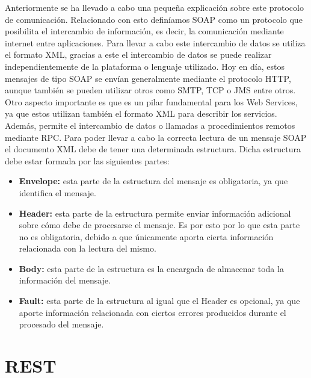 Anteriormente se ha llevado a cabo una pequeña explicación sobre este protocolo de comunicación. Relacionado con esto definíamos SOAP como un protocolo que posibilita el intercambio de información, es decir, la comunicación mediante internet entre aplicaciones. Para llevar a cabo este intercambio de datos se utiliza el formato XML, gracias a este el intercambio de datos se puede realizar independientemente de la plataforma o lenguaje utilizado.
Hoy en día, estos mensajes de tipo SOAP se envían generalmente mediante el protocolo HTTP, aunque también se pueden utilizar otros como SMTP, TCP o JMS entre otros. Otro aspecto importante es que es un pilar fundamental para los Web Services, ya que estos utilizan también el formato XML para describir los servicios. Además, permite el intercambio de datos o llamadas a procedimientos remotos mediante RPC.
Para poder llevar a cabo la correcta lectura de un mensaje SOAP el documento XML debe de tener una determinada estructura. Dicha estructura debe estar formada por las siguientes partes:

\begin{itemize}

	\item \textbf{Envelope:} esta parte de la estructura del mensaje es obligatoria, ya que identifica el mensaje.
	
	\item \textbf{Header:} esta parte de la estructura permite enviar información adicional sobre cómo debe de procesarse el mensaje. Es por esto por lo que esta parte no es obligatoria, debido a que únicamente aporta cierta información relacionada con la lectura del mismo.
	
	\item \textbf{Body:} esta parte de la estructura es la encargada de almacenar toda la información del mensaje.
	
	\item \textbf{Fault:} esta parte de la estructura al igual que el Header es opcional, ya que aporte información relacionada con ciertos errores producidos durante el procesado del mensaje.
	
\end{itemize}



\section{REST}

